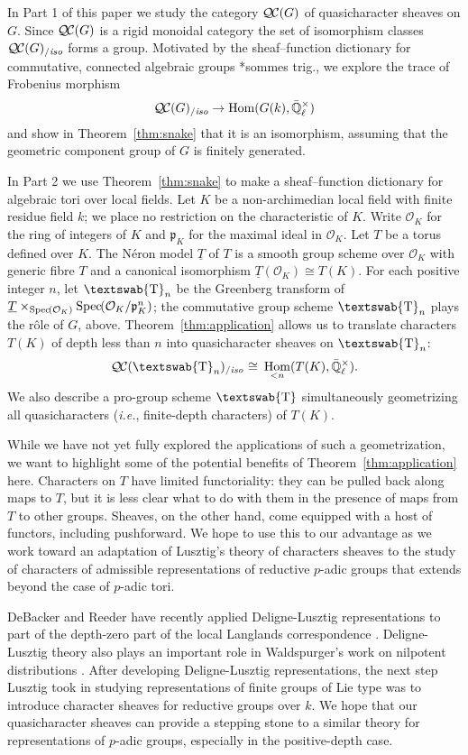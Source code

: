 \documentclass[11pt]{amsart}
\newcommand{\mathswab}[1]{\operatorname{\textswab{#1}}}
\theoremstyle{plain}
\theoremstyle{definition}
\theoremstyle{remark}
\newcommand{\Spec}[1]{{\operatorname{Spec}\hskip-1pt( #1 )}}
\newcommand{\EE}{\mathbb{\bar Q}_\ell}
\newcommand{\OK}{\mathcal{O}_K}
\newcommand{\pK}{\mathfrak{p}_K}
\newcommand{\Fq}{k}
\newcommand{\EEx}{\EE^\times}
\DeclareMathOperator{\Hom}{Hom}
\newcommand{\iso}{{\ \cong\ }}
\newcommand{\GN}[1]{\mathswab{#1}}
\newcommand{\TT}{\underline{T}}
\newcommand{\QC}{{\mathcal{Q\hskip-0.8pt C}}}
\newcommand{\QCiso}[1]{\QC(#1)_{/\textit{iso}}}
\begin{document}
In Part 1 of this paper we study the category $\QC(G)$ of quasicharacter sheaves on $G$.
Since $\QC(G)$ is a rigid monoidal category
the set of isomorphism classes $\QCiso{G}$ forms a group.
Motivated by the sheaf--function dictionary for commutative, connected
algebraic groups \cite{deligne:SGA4.5}*{sommes trig.}, 
we explore the trace of Frobenius morphism
\[
\QCiso{G} \to \Hom(G(\Fq), \EEx)
\]
and show in Theorem~\ref{thm:snake} that it is an isomorphism, 
assuming that the geometric component group of $G$ is finitely generated.

In Part 2 we use Theorem~\ref{thm:snake} to make a sheaf--function dictionary
for algebraic tori over local fields.  Let $K$ be a non-archimedian local field
with finite residue field $\Fq$; we place no restriction on the characteristic of $K$.
Write $\OK$ for the ring of integers of $K$ and $\pK$ for the maximal ideal in $\OK$.
Let $T$ be a torus defined over $K$.  The N\'eron model $\TT$ of $T$
is a smooth group scheme over $\OK$ with generic fibre $T$ and a canonical isomorphism
$\TT(\OK) \cong T(K)$.  For each positive integer $n$, let $\GN{T}_n$ be the
Greenberg transform of $\TT \times_{\Spec{\OK}} \Spec{\OK/\pK^n}$; the commutative
group scheme $\GN{T}_n$ plays the r\^{o}le of $G$, above.  Theorem~\ref{thm:application}
allows us to translate characters $T(K)$ of depth less than $n$ into quasicharacter sheaves on $\GN{T}_n$:
\[
\QCiso{\GN{T}_n} 
\iso
\Hom_{< n}(T(K),\EEx).
\]  
We also describe a pro-group scheme $\GN{T}$ simultaneously geometrizing all quasicharacters ({\it i.e.}, finite-depth characters) of $T(K)$.

While we have not yet fully explored the applications of such a geometrization, we want to highlight
some of the potential benefits of Theorem~\ref{thm:application} here. 
%
Characters on $T$ have limited
functoriality: they can be pulled back along maps to $T$, but it is less clear what to do with them
in the presence of maps from $T$ to other groups.  Sheaves, on the other hand, come
equipped with a host of functors, including pushforward. 
We hope to use this to our advantage as we work toward an adaptation of Lusztig's theory of characters sheaves to the study of characters of admissible representations of reductive $p$-adic groups that extends beyond the case of $p$-adic tori. 

DeBacker and Reeder have recently applied Deligne-Lusztig representations to part of the depth-zero part of the
local Langlands correspondence \cite{reeder-debacker:09a}.
Deligne-Lusztig theory also plays an important role in Waldspurger's work on nilpotent distributions \cite{waldspurger:01}.
After developing Deligne-Lusztig representations, 
the next step Lusztig took in studying representations
of finite groups of Lie type was to introduce character sheaves for reductive groups over $\Fq$.
We hope that our quasicharacter sheaves 
can provide a stepping stone to a similar theory for
representations of $p$-adic groups, especially
in the positive-depth case.
\end{document}
